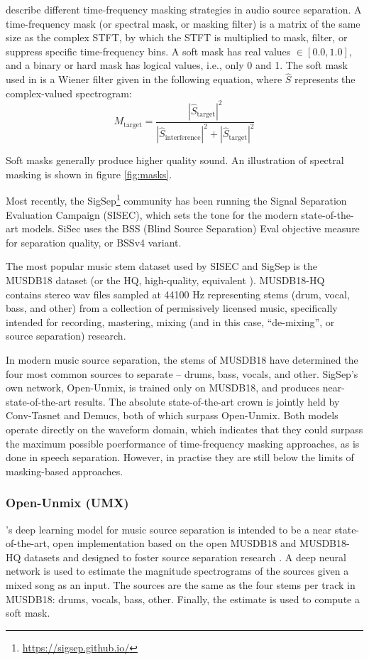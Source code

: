 \documentclass[report.tex]{subfiles}
\begin{document}
\textcite{masking} describe different time-frequency masking strategies in audio source separation. A time-frequency mask (or spectral mask, or masking filter) is a matrix of the same size as the complex STFT, by which the STFT is multiplied to mask, filter, or suppress specific time-frequency bins. A soft mask has real values $\in [0.0, 1.0]$, and a binary or hard mask has logical values, i.e., only 0 and 1. The soft mask used in \cite{fitzgerald1, fitzgerald2} is a Wiener filter given in the following equation, where $\hat{S}$ represents the complex-valued spectrogram:
\[ M_{\text{target}} = \frac{|\hat{S}_{\text{target}}|^{2}}{|\hat{S}_{\text{interference}}|^{2} + |\hat{S}_{\text{target}}|^{2}} \]

Soft masks generally produce higher quality sound. An illustration of spectral masking is shown in figure \ref{fig:masks}.

Most recently, the SigSep\footnote{\url{https://sigsep.github.io/}} community has been running the Signal Separation Evaluation Campaign (SISEC), which sets the tone for the modern state-of-the-art models. SiSec uses the BSS (Blind Source Separation) Eval \cite{bss} objective measure for separation quality, or BSSv4 variant.

The most popular music stem dataset used by SISEC and SigSep is the MUSDB18 dataset \cite{musdb18} (or the HQ, high-quality, equivalent \cite{musdb18-hq}). MUSDB18-HQ contains stereo wav files sampled at 44100 Hz representing stems (drum, vocal, bass, and other) from a collection of permissively licensed music, specifically intended for recording, mastering, mixing (and in this case, ``de-mixing'', or source separation) research.

In modern music source separation, the stems of MUSDB18 have determined the four most common sources to separate -- drums, bass, vocals, and other. SigSep's own network, Open-Unmix, is trained only on MUSDB18, and produces near-state-of-the-art results. The absolute state-of-the-art crown is jointly held by Conv-Tasnet and Demucs, both of which surpass Open-Unmix. Both models operate directly on the waveform domain, which indicates that they could surpass the maximum possible poerformance of time-frequency masking approaches, as is done in speech separation. However, in practise they are still below the limits of masking-based approaches.

\subsubsection{Open-Unmix (UMX)}

 \textcite{umx}'s deep learning model for music source separation is intended to be a near state-of-the-art, open implementation based on the open MUSDB18 and MUSDB18-HQ datasets and designed to foster source separation research \cite{musdb18, musdb18hq}. A deep neural network is used to estimate the magnitude spectrograms of the sources given a mixed song as an input. The sources are the same as the four stems per track in MUSDB18: drums, vocals, bass, other. Finally, the estimate is used to compute a soft mask.
\end{document}

